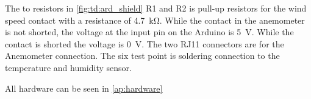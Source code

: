 The to resistors in \autoref{fig:td:ard_shield} R1 and R2 is pull-up resistors for the wind speed contact with a resistance of \SI{4.7}{\kilo\ohm}. While the contact in the anemometer is not shorted, the voltage at the input pin on the Arduino is \SI{5}{\volt}. While the contact is shorted the voltage is \SI{0}{\volt}. The two RJ11 connectors are for the Anemometer connection. The six test point is soldering connection to the temperature and humidity sensor. 

All hardware can be seen in \autoref{ap:hardware}






